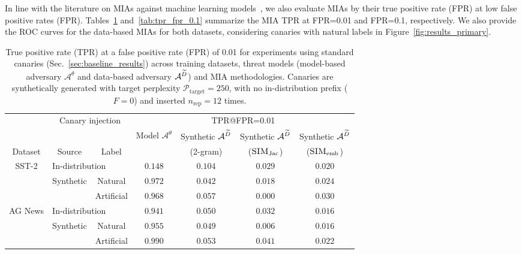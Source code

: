 In line with the literature on MIAs against machine learning models~\citep{carlini2022membership}, we also evaluate MIAs by their true positive rate (FPR) at low false positive rates (FPR). Tables~\ref{tab:tpr_fpr_0.01} and~\ref{tab:tpr_fpr_0.1} summarize the MIA TPR at FPR=\num{0.01} and FPR=\num{0.1}, respectively. We also provide the ROC curves for the data-based MIAs for both datasets, considering canaries with natural labels in Figure~\ref{fig:results_primary}.

\begin{table}[ht]
    \centering
    \begin{tabular}{ccccccc}
    \toprule
         & \multicolumn{2}{c}{Canary injection} & \multicolumn{4}{c}{TPR@FPR=0.01}\\
        \cmidrule(lr){2-3} \cmidrule(lr){4-7}
        &  &  & Model $\mathcal{A}^\theta$ & Synthetic $\mathcal{A}^{{\widetilde{D}}}$ & Synthetic $\mathcal{A}^{{\widetilde{D}}}$& Synthetic $\mathcal{A}^{{\widetilde{D}}}$ \\
        Dataset & Source & Label &   & (2-gram) & ($\textsc{SIM}_\textrm{Jac}$) & ($\textsc{SIM}_\textrm{emb}$)\\
        \midrule
        \multirow{3}{*}{\parbox{1cm}{\centering SST-2}} & \multicolumn{2}{l}{In-distribution} & $0.148$ & $0.104$ & $0.029$ & $0.020$ \\ 
        \cmidrule{2-7}
         & \multirow{2}{*}{\parbox{1.8cm}{Synthetic}} & Natural & $0.972$ & $0.042$ & $0.018$ & $0.024$ \\ 
         & & Artificial & $0.968$ & $0.057$ & $0.000$ & $0.030$ \\ 
        \midrule
        \multirow{3}{*}{\parbox{1.8cm}{\centering AG News}} & \multicolumn{2}{l}{In-distribution} & $0.941$ & $0.050$ & $0.032$ & $0.016$ \\ 
        \cmidrule{2-7} 
         & \multirow{2}{*}{\parbox{1.8cm}{Synthetic}} & Natural & $0.955$ & $0.049$ & $0.006$ & $0.016$ \\ 
         & & Artificial & $0.990$ & $0.053$ & $0.041$ & $0.022$ \\         
         \bottomrule
    \end{tabular}
    \caption{True positive rate (TPR) at a false positive rate (FPR) of 0.01 for experiments using standard canaries (Sec.~\ref{sec:baseline_results}) across training datasets, threat models (model-based adversary $\mathcal{A}^\theta$ and data-based adversary $\mathcal{A}^{{\widetilde{D}}}$) and MIA methodologies. Canaries are synthetically generated with target perplexity $\mathcal{P}_{ \textrm{target}}=250$, with no in-distribution prefix ($F=0$) and inserted $n_\textrm{rep}=12$ times.}
    \label{tab:tpr_fpr_0.01}
\end{table}

